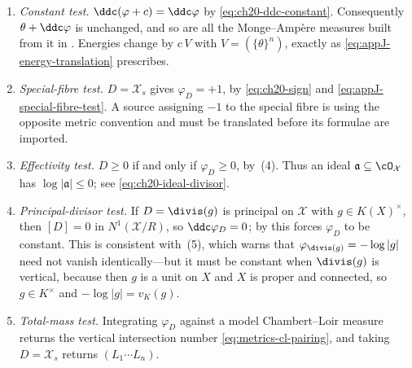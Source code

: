 \begin{enumerate}
\item \emph{Constant test.}  \(\ddc(\varphi+c)=\ddc\varphi\) by
 \eqref{eq:ch20-ddc-constant}.  Consequently
 \(\theta+\ddc\varphi\) is unchanged, and so are all the Monge--Amp\`ere
 measures built from it in .  Energies change by
 \(c\,V\) with \(V=(\{\theta\}^n)\), exactly as
 \eqref{eq:appJ-energy-translation} prescribes.
\item \emph{Special-fibre test.}  \(D=\mathcal X_s\) gives
 \(\varphi_D=+1\), by \eqref{eq:ch20-sign} and
 \eqref{eq:appJ-special-fibre-test}.  A source assigning \(-1\) to the
 special fibre is using the opposite metric convention and must be
 translated before its formulae are imported.
\item \emph{Effectivity test.}  \(D\geq0\) if and only if
 \(\varphi_D\geq0\), by
 \,(4).  Thus an ideal
 \(\mathfrak a\subseteq\cO_{\mathcal X}\) has
 \(\log|\mathfrak a|\leq0\); see \eqref{eq:ch20-ideal-divisor}.
\item \emph{Principal-divisor test.}  If \(D=\divis(g)\) is principal on
 \(\mathcal X\) with \(g\in K(X)^\times\), then \([D]=0\) in
 \(N^1(\mathcal X/R)\), so \(\ddc\varphi_D=0\); by
  this forces \(\varphi_D\) to be constant.  This
 is consistent with \,(5), which
 warns that \(\varphi_{\divis(g)}=-\log|g|\) need not vanish
 identically---but it must be constant when \(\divis(g)\) is vertical,
 because then \(g\) is a unit on \(X\) and \(X\) is proper and connected, so
 \(g\in K^\times\) and \(-\log|g|=v_K(g)\).
\item \emph{Total-mass test.}  Integrating \(\varphi_D\) against a model
 Chambert--Loir measure returns the vertical intersection number
 \eqref{eq:metrics-cl-pairing}, and taking \(D=\mathcal X_s\) returns
 \((L_1\cdots L_n)\).
\end{enumerate}

